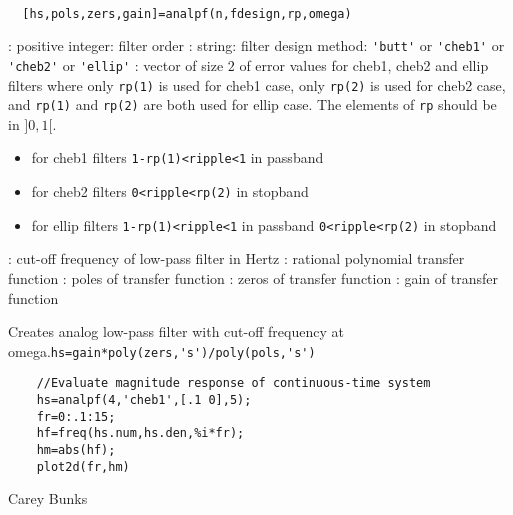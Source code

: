 \begin{mandesc}
   \\ %
\end{mandesc}
\begin{calling_sequence}
\begin{verbatim}
  [hs,pols,zers,gain]=analpf(n,fdesign,rp,omega)  
\end{verbatim}
\end{calling_sequence}
\begin{parameters}
  \begin{varlist}
    : positive integer: filter order
    : string: filter design method: \verb!'butt'! or
    \verb!'cheb1'! or \verb!'cheb2'! or \verb!'ellip'!
    : vector of size $2$ of error values for cheb1, cheb2 and ellip
    filters where only \verb!rp(1)! is used for cheb1 case, only \verb!rp(2)! is
    used for cheb2 case, and \verb!rp(1)! and \verb!rp(2)! are both used for
    ellip case. The elements of \verb!rp! should be in $]0,1[$.
    \begin{itemize}
    \item for cheb1 filters \verb!1-rp(1)<ripple<1! in passband
    \item for cheb2 filters \verb!0<ripple<rp(2)! in stopband
    \item for ellip filters \verb!1-rp(1)<ripple<1! in passband 
      \verb!0<ripple<rp(2)! in stopband
    \end{itemize}
    : cut-off frequency of low-pass filter in Hertz
    : rational polynomial transfer function
    : poles of transfer function
    : zeros of transfer function
    : gain of transfer function
  \end{varlist}
\end{parameters}
\begin{mandescription}
  Creates analog low-pass filter with cut-off frequency at
  omega.\verb!hs=gain*poly(zers,'s')/poly(pols,'s')!
\end{mandescription}
\begin{examples}
  \begin{Verbatim}
    //Evaluate magnitude response of continuous-time system 
    hs=analpf(4,'cheb1',[.1 0],5);
    fr=0:.1:15;
    hf=freq(hs.num,hs.den,%i*fr);
    hm=abs(hf);
    plot2d(fr,hm)
  \end{Verbatim}
\end{examples}
\begin{authors}
  Carey Bunks  
\end{authors}
